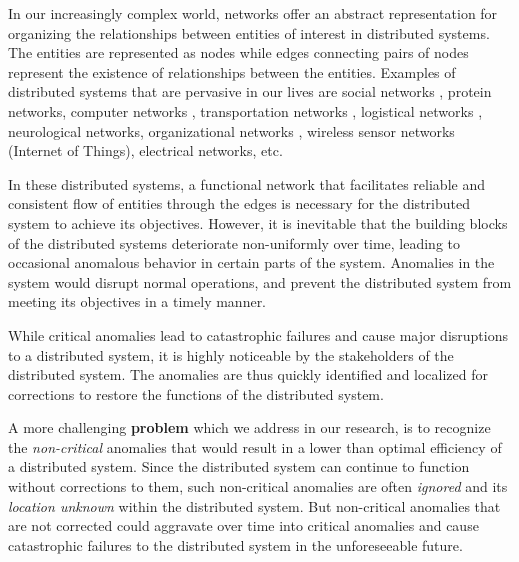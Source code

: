 \documentclass[conference]{IEEEtran.1.8}
\begin{document}
In our increasingly complex world, networks offer an abstract representation for organizing the relationships between entities of interest in distributed systems. The entities are represented as nodes while edges connecting pairs of nodes represent the existence of relationships between the entities. Examples of distributed systems that are pervasive in our lives are social networks \cite{Wu2004}, protein networks, computer networks \cite{Kind2009, Sengar2009}, transportation networks \cite{Fadlil2013, Yuan2013}, logistical networks \cite{Agovic2009}, neurological networks, organizational networks \cite{Mihm2010}, wireless sensor networks (Internet of Things), electrical networks, etc.

In these distributed systems, a functional network that facilitates reliable and consistent flow of entities through the edges is necessary for the distributed system to achieve its objectives. However, it is inevitable that the building blocks of the distributed systems deteriorate non-uniformly over time, leading to occasional anomalous behavior in certain parts of the system. Anomalies in the system would disrupt normal operations, and prevent the distributed system from meeting its objectives in a timely manner.

While critical anomalies lead to catastrophic failures and cause major disruptions to a distributed system, it is highly noticeable by the stakeholders of the distributed system. The anomalies are thus quickly identified and localized for corrections to restore the functions of the distributed system.

A more challenging \textbf{problem} which we address in our research, is to recognize the \emph{non-critical} anomalies that would result in a lower than optimal efficiency of a distributed system. Since the distributed system can continue to function without corrections to them, such non-critical anomalies are often \emph{ignored} and its \emph{location unknown} within the distributed system. But non-critical anomalies that are not corrected could aggravate over time into critical anomalies and cause catastrophic failures to the distributed system in the unforeseeable future. 
\end{document}

